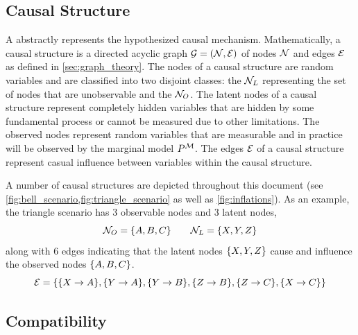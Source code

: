 \documentclass[aps, 10pt, english, twoside, pra, nofootinbib, tightenlines, longbibliography]{revtex4-1}
\begin{document}
    \subsection{Causal Structure}
    A  abstractly represents the hypothesized causal mechanism. Mathematically, a causal structure is a directed acyclic graph $\graph = \br{\nodes, \edges}$ of nodes $\mathcal{N}$ and edges $\mathcal{E}$ as defined in \cref{sec:graph_theory}. The nodes of a causal structure are random variables and are classified into two disjoint classes: the  $\mathcal{N}_L$ representing the set of nodes that are unobservable and the  $\mathcal{N}_O$. The latent nodes of a causal structure represent completely hidden variables that are hidden by some fundamental process or cannot be measured due to other limitations. The observed nodes represent random variables that are measurable and in practice will be observed by the marginal model $\prob^\mscenario$. The edges $\mathcal{E}$ of a causal structure represent casual influence between variables within the causal structure.

    A number of causal structures are depicted throughout this document (see \cref{fig:bell_scenario,fig:triangle_scenario} as well as \cref{fig:inflations}). As an example, the triangle scenario has $3$ observable nodes and $3$ latent nodes,
    \[ \nodes_{O} = \bc{A, B, C} \qquad \nodes_{L} = \bc{X, Y, Z} \]
    along with $6$ edges indicating that the latent nodes $\bc{X, Y, Z}$ cause and influence the observed nodes $\bc{A, B, C}$.
    \[ \edges = \bc{\bc{X \to A}, \bc{Y \to A}, \bc{Y \to B}, \bc{Z \to B}, \bc{Z \to C}, \bc{X \to C}} \]

    \subsection{Compatibility}
    \label{sec:compatibility}
\end{document}

